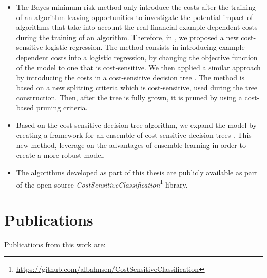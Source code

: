 \begin{itemize}
\item
  The Bayes minimum risk method only introduce the costs after the training of an algorithm leaving
  opportunities to investigate the potential impact of algorithms that take into account the real 
  financial example-dependent costs during the training of an algorithm. Therefore, in  
  \citep{CorreaBahnsen2014b}, we proposed a new cost-sensitive logistic regression.
  The   method consists in introducing example-dependent costs into a logistic regression, by 
  changing   the objective function of the model to one that is  cost-sensitive. We then applied a 
  similar approach by introducing the costs in a cost-sensitive decision tree 
  \citep{CorreaBahnsen2015}. The method is based on a new splitting criteria which is 
  cost-sensitive, used during the tree construction. Then, after the tree is fully grown, it is 
  pruned by using a cost-based pruning criteria. 
  
\item
  Based on the cost-sensitive decision tree algorithm, we expand the model by creating a framework 
  for an ensemble of cost-sensitive decision trees \citep{CorreaBahnsen2015b}. This new 
  method, leverage on the advantages of ensemble learning in order to create a more robust model.
  
\item
  The algorithms developed as part of this thesis are publicly available as part of the open-source 
  \textit{CostSensitiveClassification}\footnote{
  \url{https://github.com/albahnsen/CostSensitiveClassification}} library.
  
\end{itemize}

\newpage
\section{Publications}

Publications from this work are:
\bigskip

